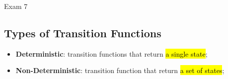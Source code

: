 \documentclass{note}
\begin{document}
\begin{note}{Exam 7}
    \subsection{Types of Transition Functions}
    
    \begin{itemize}
        \item \textbf{Deterministic}: transition functions that return \hl{a single state};
        \item \textbf{Non-Deterministic}: transition function that return \hl{a set of states};
    \end{itemize}
    
    

\end{note}
\end{document}
